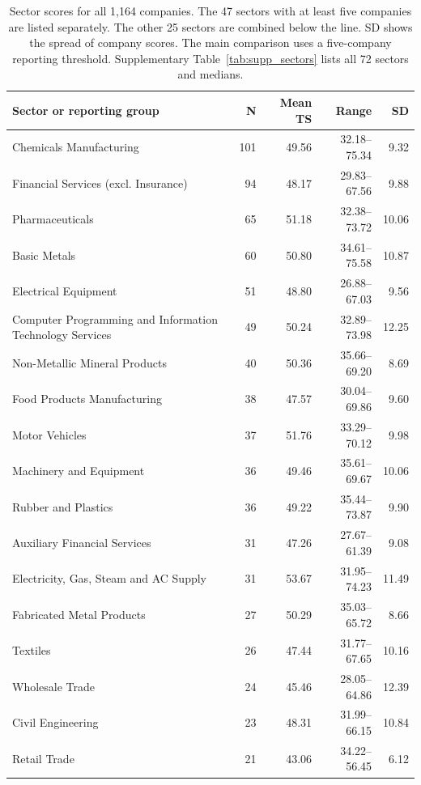 \begin{table}[p]
\begin{singlepagetable}
\centering
\begingroup
\footnotesize
\setlength{\tabcolsep}{5pt}
\renewcommand{\arraystretch}{1.00}
\caption{Sector scores for all 1,164 companies. The 47 sectors with at least five companies are listed separately. The other 25 sectors are combined below the line. SD shows the spread of company scores. The main comparison uses a five-company reporting threshold. Supplementary Table~\ref{tab:supp_sectors} lists all 72 sectors and medians.}
\label{tab:all_sectors}
\begin{tabularx}{\linewidth}{@{}Yrrrr@{}}
\toprule\textbf{Sector or reporting group} & \textbf{N} & \textbf{Mean TS} & \textbf{Range} & \textbf{SD}\\\midrule
Chemicals Manufacturing & 101 & 49.56 & 32.18--75.34 & 9.32 \\
Financial Services (excl. Insurance) & 94 & 48.17 & 29.83--67.56 & 9.88 \\
Pharmaceuticals & 65 & 51.18 & 32.38--73.72 & 10.06 \\
Basic Metals & 60 & 50.80 & 34.61--75.58 & 10.87 \\
Electrical Equipment & 51 & 48.80 & 26.88--67.03 & 9.56 \\
Computer Programming and Information Technology Services & 49 & 50.24 & 32.89--73.98 & 12.25 \\
Non-Metallic Mineral Products & 40 & 50.36 & 35.66--69.20 & 8.69 \\
Food Products Manufacturing & 38 & 47.57 & 30.04--69.86 & 9.60 \\
Motor Vehicles & 37 & 51.76 & 33.29--70.12 & 9.98 \\
Machinery and Equipment & 36 & 49.46 & 35.61--69.67 & 10.06 \\
Rubber and Plastics & 36 & 49.22 & 35.44--73.87 & 9.90 \\
Auxiliary Financial Services & 31 & 47.26 & 27.67--61.39 & 9.08 \\
Electricity, Gas, Steam and AC Supply & 31 & 53.67 & 31.95--74.23 & 11.49 \\
Fabricated Metal Products & 27 & 50.29 & 35.03--65.72 & 8.66 \\
Textiles & 26 & 47.44 & 31.77--67.65 & 10.16 \\
Wholesale Trade & 24 & 45.46 & 28.05--64.86 & 12.39 \\
Civil Engineering & 23 & 48.31 & 31.99--66.15 & 10.84 \\
Retail Trade & 21 & 43.06 & 34.22--56.45 & 6.12 \\

\end{tabularx}
\end{singlepagetable}
\end{table}
